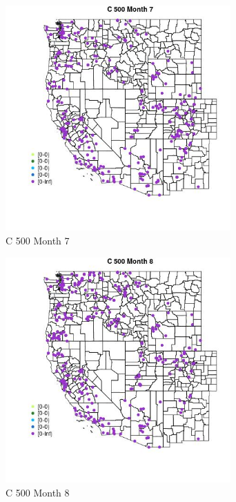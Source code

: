 \begin{figure} 
\centering  
\includegraphics[width=0.77\textwidth]{Code_Outputs/Report_ML_input_PM25_Step4_part_e_de_duplicated_aveswNAs_MapObsMo7C_500.jpg} 
\caption{\label{fig:Report_ML_input_PM25_Step4_part_e_de_duplicated_aveswNAsMapObsMo7C_500}C 500 Month 7} 
\end{figure} 
 

\begin{figure} 
\centering  
\includegraphics[width=0.77\textwidth]{Code_Outputs/Report_ML_input_PM25_Step4_part_e_de_duplicated_aveswNAs_MapObsMo8C_500.jpg} 
\caption{\label{fig:Report_ML_input_PM25_Step4_part_e_de_duplicated_aveswNAsMapObsMo8C_500}C 500 Month 8} 
\end{figure} 
 

